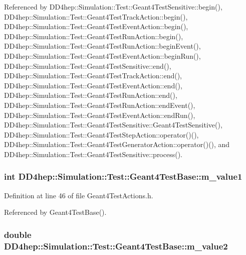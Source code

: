 Referenced by DD4hep::Simulation::Test::Geant4TestSensitive::begin(), DD4hep::Simulation::Test::Geant4TestTrackAction::begin(), DD4hep::Simulation::Test::Geant4TestEventAction::begin(), DD4hep::Simulation::Test::Geant4TestRunAction::begin(), DD4hep::Simulation::Test::Geant4TestRunAction::beginEvent(), DD4hep::Simulation::Test::Geant4TestEventAction::beginRun(), DD4hep::Simulation::Test::Geant4TestSensitive::end(), DD4hep::Simulation::Test::Geant4TestTrackAction::end(), DD4hep::Simulation::Test::Geant4TestEventAction::end(), DD4hep::Simulation::Test::Geant4TestRunAction::end(), DD4hep::Simulation::Test::Geant4TestRunAction::endEvent(), DD4hep::Simulation::Test::Geant4TestEventAction::endRun(), DD4hep::Simulation::Test::Geant4TestSensitive::Geant4TestSensitive(), DD4hep::Simulation::Test::Geant4TestStepAction::operator()(), DD4hep::Simulation::Test::Geant4TestGeneratorAction::operator()(), and DD4hep::Simulation::Test::Geant4TestSensitive::process().\hypertarget{class_d_d4hep_1_1_simulation_1_1_test_1_1_geant4_test_base_ae953f3bd81b4ee602820d75dd39ddceb}{
\subsubsection[{m\_\-value1}]{\setlength{\rightskip}{0pt plus 5cm}int {\bf DD4hep::Simulation::Test::Geant4TestBase::m\_\-value1}}}
\label{class_d_d4hep_1_1_simulation_1_1_test_1_1_geant4_test_base_ae953f3bd81b4ee602820d75dd39ddceb}


Definition at line 46 of file Geant4TestActions.h.

Referenced by Geant4TestBase().\hypertarget{class_d_d4hep_1_1_simulation_1_1_test_1_1_geant4_test_base_a782a7fd9a4c6920190976bfc7220c53e}{
\subsubsection[{m\_\-value2}]{\setlength{\rightskip}{0pt plus 5cm}double {\bf DD4hep::Simulation::Test::Geant4TestBase::m\_\-value2}}}
\label{class_d_d4hep_1_1_simulation_1_1_test_1_1_geant4_test_base_a782a7fd9a4c6920190976bfc7220c53e}


